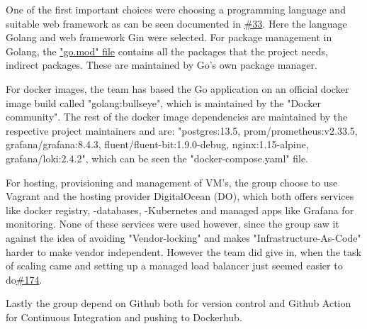 
One of the first important choices were choosing a programming language and suitable web framework as can be seen documented in \href{https://github.com/DevelOpsITU/MiniTwit/issues/33}{\#33}. Here the language Golang and web framework Gin were selected. For package management in Golang, the \href{https://github.com/DevelOpsITU/MiniTwit/blob/main/go.mod}{"go.mod" file} contains all the packages that the project needs, indirect packages. These are maintained by Go's own package manager.

For docker images, the team has based the Go application on an official docker image build called "golang:bullseye", which is maintained by the "Docker community"\cite{docker_go_image}. The rest of the docker image dependencies are maintained by the respective project maintainers and are: "postgres:13.5, prom/prometheus:v2.33.5, grafana/grafana:8.4.3, fluent/fluent-bit:1.9.0-debug, nginx:1.15-alpine, grafana/loki:2.4.2", which can be seen the "docker-compose.yaml"\cite{github_minitwit_dockercompose} file.

For hosting, provisioning and management of VM's, the group choose to use Vagrant and the hosting provider DigitalOcean (DO), which both offers services like docker registry, -databases, -Kubernetes and managed apps like Grafana for monitoring. None of these services were used however, since the group saw it against the idea of avoiding "Vendor-locking" and makes "Infrastructure-As-Code" harder to make vendor independent. However the team did give in, when the task of scaling came and setting up a managed load balancer just seemed easier to do\href{https://github.com/DevelOpsITU/MiniTwit/issues/174}{\#174}. 

Lastly the group depend on Github both for version control and Github Action for Continuous Integration and pushing to Dockerhub.




